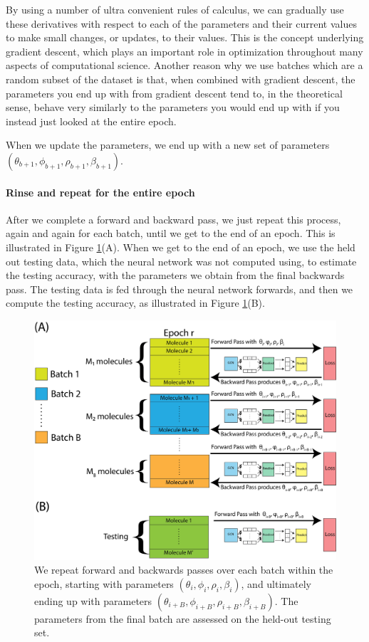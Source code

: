 By using a number of ultra convenient rules of calculus, we can gradually use these derivatives with respect to each of the parameters and their current values to make small changes, or updates, to their values. This is the concept underlying gradient descent, which plays an important role in optimization throughout many aspects of computational science. Another reason why we use batches which are a random subset of the dataset is that, when combined with gradient descent, the parameters you end up with from gradient descent tend to, in the theoretical sense, behave very similarly to the parameters you would end up with if you instead just looked at the entire epoch.

When we update the parameters, we end up with a new set of parameters $(\theta_{b + 1}, \phi_{b + 1}, \rho_{b + 1}, \beta_{b + 1})$.

\paragraph*{Rinse and repeat for the entire epoch}

After we complete a forward and backward pass, we just repeat this process, again and again for each batch, until we get to the end of an epoch. This is illustrated in Figure \ref{fig:next:gnn:epoch_compute}(A). When we get to the end of an epoch, we use the held out testing data, which the neural network was not computed using, to estimate the testing accuracy, with the parameters we obtain from the final backwards pass. The testing data is fed through the neural network forwards, and then we compute the testing accuracy, as illustrated in Figure \ref{fig:next:gnn:epoch_compute}(B).

\begin{figure}
    \centering
    \includegraphics[width=\linewidth]{next/Images/epoch_compute.png}
    \caption[A single epoch forward and backwards passes]{
We repeat forward and backwards passes over each batch within the epoch, starting with parameters $(\theta_i, \phi_i, \rho_i, \beta_i)$, and ultimately ending up with parameters $(\theta_{i + B}, \phi_{i + B}, \rho_{i + B}, \beta_{i + B})$. The parameters from the final batch are assessed on the held-out testing set.}
    \label{fig:next:gnn:epoch_compute}
\end{figure}
